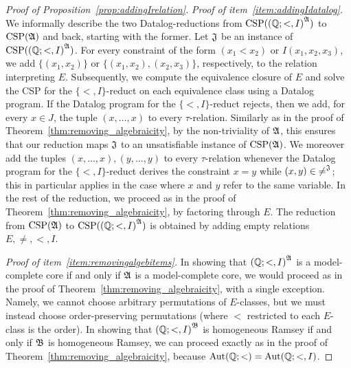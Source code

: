 \begin{proof}[Proof of Proposition~\ref{prop:addingIrelation}]
\textit{Proof of item~\ref{item:addingIdatalog}.} We informally describe the two Datalog-reductions from $\mathrm{CSP}({(\mathbb{Q};<,I)}^{\mathfrak{A}})$ to $\mathrm{CSP}(\mathfrak{A})$ and back, starting with the former.
%  
Let $\mathfrak{J}$ be an instance of $\mathrm{CSP}({(\mathbb{Q};<,I)}^{\mathfrak{A}})$.
%
For every constraint of the form $(x_1<x_2)$ or $I(x_1,x_2,x_3)$, we add $\{(x_1,x_2)\}$ or $\{(x_1,x_2),(x_2,x_3)\}$, respectively, to the relation interpreting $E$. 
%
Subsequently, we compute the equivalence closure of $E$ and solve the CSP for the $\{<,I\}$-reduct on each equivalence class using a Datalog program. 
%   
If the Datalog program for the $\{<,I\}$-reduct rejects, then we add, for every $x\in J$, the tuple $(x,\dots, x)$ to every $\tau$-relation.
%
Similarly as in the proof of Theorem~\ref{thm:removing_algebraicity}, by the non-triviality of $\mathfrak{A}$, this ensures that our reduction maps $\mathfrak{J}$ to an unsatisfiable instance of $\mathrm{CSP}(\mathfrak{A})$.
%
We moreover add the tuples $(x,\dots, x),(y,\dots, y)$ to every $\tau$-relation whenever the Datalog program for the $\{<,I\}$-reduct derives the constraint $x=y$ while $(x,y)\in {\neq}^{\mathfrak{J}}$; this in particular applies in the case where  
$x$ and $y$ refer to the same variable. 
%
In the rest of the reduction, we proceed as in the proof of Theorem~\ref{thm:removing_algebraicity}, by factoring through $E$.
%
The reduction from $\mathrm{CSP}(\mathfrak{A})$ to $\mathrm{CSP}({(\mathbb{Q};<,I)}^{\mathfrak{A}})$ is obtained by adding empty relations $E,\neq,<,I$.  

\textit{Proof of item~\ref{item:removingalgebitems}.}
%
In showing that ${(\mathbb{Q};<,I)}^{\mathfrak{A}}$ is a model-complete core if and only if $\mathfrak{A}$ is a model-complete core, we would proceed as in the proof of Theorem~\ref{thm:removing_algebraicity}, with a single exception.
%
Namely, we cannot choose arbitrary permutations of $E$-classes, but we must instead choose order-preserving permutations (where $<$ restricted to each $E$-class is the order).
%
In showing that ${(\mathbb{Q};<,I)}^{\mathfrak{B}}$ is homogeneous Ramsey if and only if $\mathfrak{B}$ is homogeneous Ramsey, we can proceed exactly as in the proof of Theorem~\ref{thm:removing_algebraicity}, because $\mathrm{Aut}(\mathbb{Q};<)=\mathrm{Aut}(\mathbb{Q};<,I)$.
%


\end{proof}
